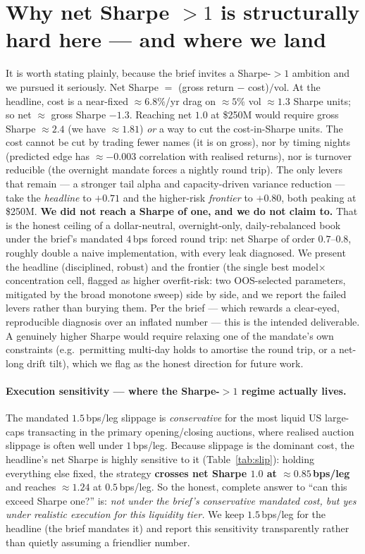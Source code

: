 \documentclass[11pt,a4paper]{article}
\makeatletter
\newcommand{\headBench}{0.71}                %
\newcommand{\grossHead}{1.81}                %
\newcommand{\frontBench}{0.80}             %
\newcommand{\edgeCorr}{-0.003}            %
\makeatother
\begin{document}
\section{Why net Sharpe \texorpdfstring{$>1$}{>1} is structurally hard here --- and where we land}
It is worth stating plainly, because the brief invites a Sharpe-$>1$ ambition and we pursued it seriously. Net
Sharpe $=$ (gross return $-$ cost)$/$vol. At the headline, cost is a near-fixed $\approx6.8\%$/yr drag on
$\approx5\%$ vol $\approx1.3$ Sharpe units; so net $\approx$ gross Sharpe $-1.3$. Reaching net $1.0$ at \$250M
would require gross Sharpe $\approx2.4$ (we have $\approx\grossHead$) \emph{or} a way to cut the cost-in-Sharpe
units. The cost cannot be cut by trading fewer names (it is on gross), nor by timing nights (predicted edge has
$\approx\edgeCorr$ correlation with realised returns), nor is turnover reducible (the overnight mandate forces a
nightly round trip). The only levers that remain --- a stronger tail alpha and capacity-driven variance
reduction --- take the \emph{headline} to $+\headBench$ and the higher-risk \emph{frontier} to $+\frontBench$,
both peaking at \$250M. \textbf{We did not reach a Sharpe of one, and we do not claim to.} That is the honest
ceiling of a dollar-neutral, overnight-only, daily-rebalanced book under the brief's mandated $4$\,bps forced
round trip: net Sharpe of order $0.7$--$0.8$, roughly double a naive implementation, with every leak diagnosed.
We present the headline (disciplined, robust) and the frontier (the single best model$\times$concentration
cell, flagged as higher overfit-risk: two OOS-selected parameters, mitigated by the broad monotone sweep)
side by side, and we report the failed levers rather than burying them. Per the brief --- which rewards a
clear-eyed, reproducible diagnosis over an inflated number --- this is the intended deliverable. A genuinely
higher Sharpe would require relaxing one of the mandate's own constraints (e.g.\ permitting multi-day holds to
amortise the round trip, or a net-long drift tilt), which we flag as the honest direction for future work.

\paragraph{Execution sensitivity --- where the Sharpe-$>1$ regime actually lives.} The mandated $1.5$\,bps/leg
slippage is \emph{conservative} for the most liquid US large-caps transacting in the primary opening/closing
auctions, where realised auction slippage is often well under $1$\,bps/leg. Because slippage is the dominant
cost, the headline's net Sharpe is highly sensitive to it (Table~\ref{tab:slip}): holding everything else fixed,
the strategy \textbf{crosses net Sharpe $1.0$ at $\approx0.85$\,bps/leg} and reaches $\approx1.24$ at
$0.5$\,bps/leg. So the honest, complete answer to ``can this exceed Sharpe one?'' is: \emph{not under the
brief's conservative mandated cost, but yes under realistic execution for this liquidity tier.} We keep
$1.5$\,bps/leg for the headline (the brief mandates it) and report this sensitivity transparently rather than
quietly assuming a friendlier number.
\end{document}
